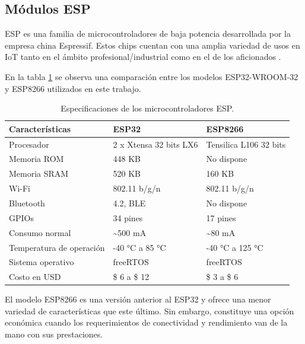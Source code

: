 \subsection{Módulos ESP}
\label{sec:Módulos ESP}
ESP es una familia de microcontroladores de baja potencia  desarrollada por la empresa china Espressif. Estos chips cuentan con una amplia variedad de usos en IoT tanto en el ámbito profesional/industrial como en el de los aficionados \citep{esp32} \citep{esp8266}. 

En la tabla \ref{tab:esp} se observa una comparación entre los modelos ESP32-WROOM-32 y ESP8266 utilizados en este trabajo.





\begin{table}[h]
\centering
\caption[Especificaciones de los microcontroladores ESP.]{Especificaciones de los microcontroladores ESP.}

\begin{tabular} {p{4.5cm} p{3.7cm} p{3.7cm}} 
\toprule
\textbf{Características} & \textbf{ESP32} \citep{esp32}  & \textbf{ESP8266} \citep{esp8266} \\
\midrule
Procesador		& 2 x Xtensa 32 bits LX6	& Tensilica L106 32 bits\\
Memoria ROM	 	& 448 KB	& No dispone\\	
Memoria SRAM	& 520 KB	& 160 KB\\
Wi-Fi			& 802.11 b/g/n & 802.11 b/g/n\\
Bluetooth		& 4.2, BLE & No dispone\\
GPIOs			& 34 pines & 17 pines\\
Consumo normal	& \textasciitilde 500 mA & \textasciitilde 80 mA \\
Temperatura de operación		& -40 °C a 85 °C & -40 °C a 125 °C \\
Sistema operativo &	freeRTOS	& freeRTOS \\
Costo en USD	& \$ 6 a \$ 12  & \$ 3 a  \$ 6 \\
\bottomrule
\hline
\end{tabular}
\label{tab:esp}
\end{table}

El modelo ESP8266 es una versión anterior al ESP32 y ofrece una menor variedad de características que este último. Sin embargo, constituye una opción económica cuando los requerimientos de conectividad y rendimiento van de la mano con sus prestaciones.

 

